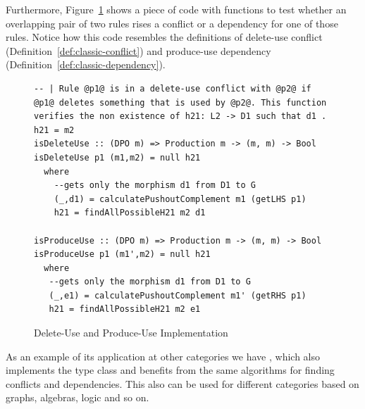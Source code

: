 Furthermore, Figure~\ref{fig:verigraph:delete-use-produce-use} shows a piece of code with functions to test whether an overlapping pair of two rules rises a conflict or a dependency for one of those rules. Notice how this code resembles the definitions of delete-use conflict (Definition~\ref{def:classic-conflict}) and produce-use dependency (Definition~\ref{def:classic-dependency}).


\begin{figure}[!ht]
\caption{Delete-Use and Produce-Use Implementation}
\begin{verbatim}
-- | Rule @p1@ is in a delete-use conflict with @p2@ if @p1@ deletes something that is used by @p2@. This function verifies the non existence of h21: L2 -> D1 such that d1 . h21 = m2
isDeleteUse :: (DPO m) => Production m -> (m, m) -> Bool
isDeleteUse p1 (m1,m2) = null h21
  where
    --gets only the morphism d1 from D1 to G
    (_,d1) = calculatePushoutComplement m1 (getLHS p1) 
    h21 = findAllPossibleH21 m2 d1

isProduceUse :: (DPO m) => Production m -> (m, m) -> Bool
isProduceUse p1 (m1',m2) = null h21
  where
   --gets only the morphism d1 from D1 to G
   (_,e1) = calculatePushoutComplement m1' (getRHS p1)
   h21 = findAllPossibleH21 m2 e1
\end{verbatim}
\label{fig:verigraph:delete-use-produce-use}
\end{figure}

As an example of its application at other categories we have , which also implements the  type class and benefits from the same algorithms for finding conflicts and dependencies. This also can be used for different categories based on graphs, algebras, logic and so on.



